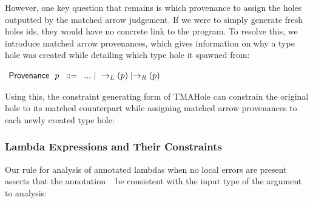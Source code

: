 However, one key question that remains is which provenance to assign the holes outputted by the matched arrow judgement. If we were to simply generate fresh holes ids, they would have no concrete link to the program. To resolve this, we introduce matched arrow provenances, which gives information on why a type hole was created while detailing which type hole it spawned from:
\begin{center}
    $\arraycolsep=4pt\begin{array}{lll}
    \Prov~~ p & ::= & 
        ... ~\vert~ 
        \rightarrow_L(\Provp) \mid \rightarrow_R(\Provp)
        \\
    \end{array}$
\end{center}
Using this, the constraint generating form of TMAHole can constrain the original hole to its matched counterpart while assigning matched arrow provenances to each newly created type hole:
\begin{mathpar}
\end{mathpar}

\subsubsection{Lambda Expressions and Their Constraints}
Our rule for analysis of annotated lambdas when no local errors are present asserts that the annotation \TMV~ be consistent with the input type of the argument to analysis:
\begin{mathpar}
\end{mathpar}

